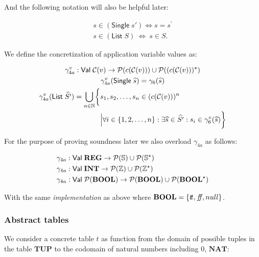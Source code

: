And the following notation will also be helpful later:


\begin{align}
    s \in (\mathsf{Single} \; s') \iff s = s^\prime \\
    s \in (\mathsf{List} \; S) \ \iff \ s \in S.
\end{align}


We define the concretization of application variable values as:


\begin{gather}
    \gamma^v_{4a} : \mathsf{Val} \; \mathcal{C}(v) \rightarrow \mathcal{P}(c(\mathcal{C}(v))) \cup\mathcal{P}((c(\mathcal{C}(v)))^\star)\\
    \gamma^v_{4a}(\mathsf{Single} \; \widehat{s}) = \gamma_6(\widehat{s})\\
    \begin{split}
        \gamma^v_{4a}(\mathsf{List} \; \widehat{S'}) = \bigcup_{n \in \mathbb{N}}\biggl\{&s_1, s_2, \dots, s_n \in (c(\mathcal{C}(v)))^n \\
        & \Big| \forall i \in \{1, 2, \dots, n\} : \exists \widehat{s} \in \widehat{S'} : s_i \in \gamma^v_6(\widehat{s}) \biggr\}
    \end{split}
\end{gather}


For the purpose of proving soundness later we also overload $\gamma_{4a}$ as follows:


\begin{align}
    \gamma_{4a} &: \mathsf{Val} \; \mathbf{REG} \rightarrow \mathcal{P}(\mathbb{S}) \cup \mathcal{P}(\mathbb{S}^\star)\\
    \gamma_{4a} &: \mathsf{Val} \; \mathbf{INT} \rightarrow \mathcal{P}(\mathbb{Z}) \cup \mathcal{P}(\mathbb{Z}^\star) \\
    \gamma_{4a} &: \mathsf{Val} \; \mathcal{P}(\mathbf{BOOL}) \rightarrow \mathcal{P}(\mathbf{BOOL}) \cup \mathcal{P}(\mathbf{BOOL}^\star)
\end{align}

With the same \emph{implementation} as above where $\mathbf{BOOL} = \{t\!t, f\!\!f, null\}$.

\subsubsection{Abstract tables}\label{subsubsec:abstract_domain_of_tables}
We consider a concrete table $t$ as function from the domain of possible tuples in the table $\mathbf{TUP}$ to the codomain of natural numbers including $0$, $\mathbf{NAT}$:



